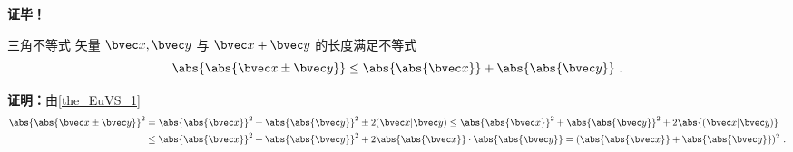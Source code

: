 \textbf{证毕！}
\begin{corollary}{三角不等式}\label{cor_EuVS_1}
矢量 $\bvec x,\bvec y$ 与 $\bvec x+\bvec y$ 的长度满足不等式
\begin{equation}
\abs{\abs{\bvec x\pm\bvec y}}\leq\abs{\abs{\bvec x}}+\abs{\abs{\bvec y}}~.
\end{equation}
\end{corollary}
\textbf{证明：}由\autoref{the_EuVS_1} 
\begin{equation}
\begin{aligned}
\abs{\abs{\bvec x\pm\bvec y}}^2&=\abs{\abs{\bvec x}}^2+\abs{\abs{\bvec y}}^2\pm2(\bvec x|\bvec y)\leq\abs{\abs{\bvec x}}^2+\abs{\abs{\bvec y}}^2+2\abs{(\bvec x|\bvec y)}\\
&\leq \abs{\abs{\bvec x}}^2+\abs{\abs{\bvec y}}^2+2\abs{\abs{\bvec x}}\cdot\abs{\abs{\bvec y}}=(\abs{\abs{\bvec x}}+\abs{\abs{\bvec y}})^2~.
\end{aligned}
\end{equation}

